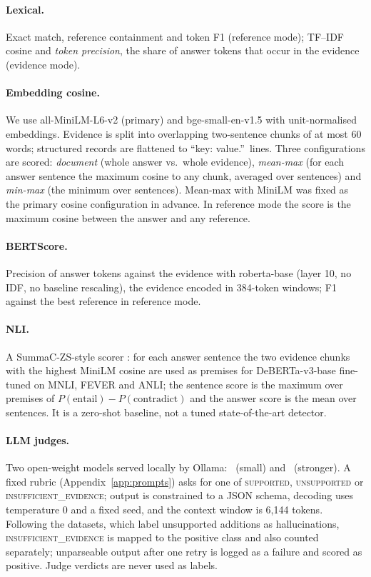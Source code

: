 \paragraph{Lexical.} Exact match, reference containment and token F1 (reference mode); TF--IDF cosine and \emph{token precision}, the share of answer tokens that occur in the evidence (evidence mode).

\paragraph{Embedding cosine.} We use all-MiniLM-L6-v2 (primary) and bge-small-en-v1.5 with unit-normalised embeddings. Evidence is split into overlapping two-sentence chunks of at most 60 words; structured records are flattened to ``key: value.''\ lines. Three configurations are scored: \emph{document} (whole answer vs.\ whole evidence), \emph{mean-max} (for each answer sentence the maximum cosine to any chunk, averaged over sentences) and \emph{min-max} (the minimum over sentences). Mean-max with MiniLM was fixed as the primary cosine configuration in advance. In reference mode the score is the maximum cosine between the answer and any reference.

\paragraph{BERTScore.} Precision of answer tokens against the evidence with roberta-base (layer 10, no IDF, no baseline rescaling), the evidence encoded in 384-token windows; F1 against the best reference in reference mode.

\paragraph{NLI.} A SummaC-ZS-style scorer \citep{laban2022summac}: for each answer sentence the two evidence chunks with the highest MiniLM cosine are used as premises for DeBERTa-v3-base fine-tuned on MNLI, FEVER and ANLI; the sentence score is the maximum over premises of $P(\text{entail})-P(\text{contradict})$ and the answer score is the mean over sentences. It is a zero-shot baseline, not a tuned state-of-the-art detector.

\paragraph{LLM judges.} Two open-weight models served locally by Ollama: \JudgeSmallModel\ (small) and \JudgeStrongModel\ (stronger). A fixed rubric (Appendix~\ref{app:prompts}) asks for one of \textsc{supported}, \textsc{unsupported} or \textsc{insufficient\_evidence}; output is constrained to a JSON schema, decoding uses temperature 0 and a fixed seed, and the context window is 6{,}144 tokens. Following the datasets, which label unsupported additions as hallucinations, \textsc{insufficient\_evidence} is mapped to the positive class and also counted separately; unparseable output after one retry is logged as a failure and scored as positive. Judge verdicts are never used as labels.

